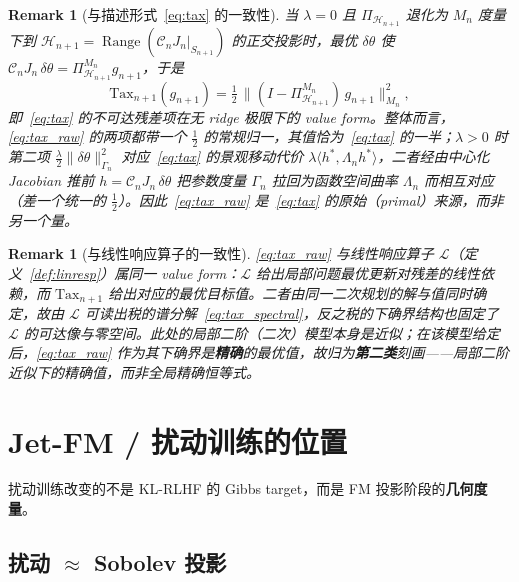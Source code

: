 \documentclass[11pt,a4paper]{article}
\newtheorem{remark}[theorem]{Remark}
\newcommand{\cL}{\mathcal{L}}
\newcommand{\cH}{\mathcal{H}}
\newcommand{\ProjectOp}{\Pi}
\newcommand{\Range}{\operatorname{Range}}
\newcommand{\Center}{\mathcal{C}}
\begin{document}
\begin{remark}[与描述形式~\eqref{eq:tax} 的一致性]
当 $\lambda=0$ 且 $\ProjectOp_{\cH_{n+1}}$ 退化为 $M_n$ 度量下到 $\cH_{n+1}=\Range(\Center_n J_n|_{S_{n+1}})$ 的正交投影时，最优 $\delta\theta$ 使 $\Center_n J_n\,\delta\theta=\ProjectOp_{\cH_{n+1}}^{M_n}g_{n+1}$，于是
\[
\text{Tax}_{n+1}(g_{n+1})=\tfrac12\,\bigl\|(I-\ProjectOp_{\cH_{n+1}}^{M_n})\,g_{n+1}\bigr\|_{M_n}^2,
\]
即~\eqref{eq:tax} 的不可达残差项在无 ridge 极限下的 value form。整体而言，\eqref{eq:tax_raw} 的两项都带一个 $\tfrac12$ 的常规归一，其值恰为~\eqref{eq:tax} 的一半；$\lambda>0$ 时第二项 $\tfrac{\lambda}{2}\|\delta\theta\|_{\Gamma_n}^2$ 对应~\eqref{eq:tax} 的景观移动代价 $\lambda\langle h^*,\Lambda_n h^*\rangle$，二者经由中心化 Jacobian 推前 $h=\Center_n J_n\,\delta\theta$ 把参数度量 $\Gamma_n$ 拉回为函数空间曲率 $\Lambda_n$ 而相互对应（差一个统一的 $\tfrac12$）。因此~\eqref{eq:tax_raw} 是~\eqref{eq:tax} 的原始（primal）来源，而非另一个量。
\end{remark}

\begin{remark}[与线性响应算子的一致性]
\eqref{eq:tax_raw} 与线性响应算子 $\cL$（定义~\ref{def:linresp}）属同一 value form：$\cL$ 给出局部问题最优更新对残差的线性依赖，而 $\text{Tax}_{n+1}$ 给出对应的最优目标值。二者由同一二次规划的解与值同时确定，故由 $\cL$ 可读出税的谱分解~\eqref{eq:tax_spectral}，反之税的下确界结构也固定了 $\cL$ 的可达像与零空间。此处的局部二阶（二次）模型本身是近似；在该模型给定后，\eqref{eq:tax_raw} 作为其下确界是\textbf{精确}的最优值，故归为\textbf{第二类}刻画——局部二阶近似下的精确值，而非全局精确恒等式。
\end{remark}

\section{Jet-FM / 扰动训练的位置}
\label{sec:jet_fm}

扰动训练改变的不是 KL-RLHF 的 Gibbs target，而是 FM 投影阶段的\textbf{几何度量}。

\subsection{扰动 $\approx$ Sobolev 投影}
\end{document}

